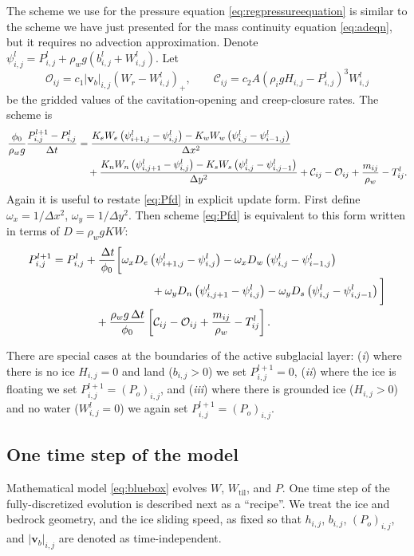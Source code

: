 \documentclass[11pt,final]{amsart}
\newcommand\bv{\mathbf{v}}
\newcommand{\Wtil}{W_{\text{til}}}
\newcommand{\Wlij}{W^l_{i,j}}
\newcommand{\Plij}{P^l_{i,j}}
\begin{document}
The scheme we use for the pressure equation \eqref{eq:regpressureequation} is similar to the scheme we have just presented for the mass continuity equation \eqref{eq:adeqn}, but it requires no advection approximation.  Denote $\psi_{i,j}^l = P_{i,j}^l + \rho_w g (b_{i,j}^l + W_{i,j}^l)$.  Let
	$$\mathcal{O}_{ij} = c_1 |\bv_b|_{i,j} \left(W_r - \Wlij\right)_+, \qquad \mathcal{C}_{ij} = c_2 A \left(\rho_i g H_{i,j} - \Plij\right)^3 \Wlij$$
be the gridded values of the cavitation-opening and creep-closure rates.  The scheme is
\begin{align}
\frac{\phi_0}{\rho_w g} \frac{P_{i,j}^{l+1} - \Plij}{\Delta t} &= \frac{K_e W_e \left(\psi_{i+1,j}^l - \psi_{i,j}^l\right) - K_w W_w \left(\psi_{i,j}^l - \psi_{i-1,j}^l\right)}{\Delta x^2}  \label{eq:Pfd} \\
      &\quad + \frac{K_n W_n \left(\psi_{i,j+1}^l - \psi_{i,j}^l\right) - K_s W_s \left(\psi_{i,j}^l - \psi_{i,j-1}^l\right)}{\Delta y^2} + \mathcal{C}_{ij} - \mathcal{O}_{ij} + \frac{m_{ij}}{\rho_w} - T_{ij}^l. \notag
\end{align}
Again it is useful to restate \eqref{eq:Pfd} in explicit update form.  First define $\omega_x = 1/\Delta x^2$, $\omega_y = 1/\Delta y^2$.   Then scheme \eqref{eq:Pfd} is equivalent to this form written in terms of $D=\rho_w g K W$:
\begin{align}
P_{i,j}^{l+1} = \Plij &+  \frac{\,\Delta t}{\phi_0} \bigg[\omega_x D_e \left(\psi_{i+1,j}^l - \psi_{i,j}^l\right) - \omega_x D_w \left(\psi_{i,j}^l - \psi_{i-1,j}^l\right) \label{eq:Pfdupdate} \\
      &\qquad\qquad\qquad + \omega_y D_n \left(\psi_{i,j+1}^l - \psi_{i,j}^l\right) - \omega_y D_s \left(\psi_{i,j}^l - \psi_{i,j-1}^l\right)\bigg] \notag \\
      &\quad + \frac{\rho_w g\,\Delta t}{\phi_0} \left[\mathcal{C}_{ij} - \mathcal{O}_{ij} + \frac{m_{ij}}{\rho_w} - T_{ij}^l\right]. \notag
\end{align}

There are special cases at the boundaries of the active subglacial layer: (\emph{i}) where there is no ice $H_{i,j}=0$ and land ($b_{i,j}>0$) we set $P_{i,j}^{l+1}=0$, (\emph{ii}) where the ice is floating we set $P_{i,j}^{l+1}=(P_o)_{i,j}$, and (\emph{iii}) where there is grounded ice ($H_{i,j}>0$) and no water ($W_{i,j}^l=0$) we again set $P_{i,j}^{l+1}=(P_o)_{i,j}$. 

\subsection*{One time step of the model}  Mathematical model \eqref{eq:bluebox} evolves $W$, $\Wtil$, and $P$.  One time step of the fully-discretized evolution is described next as a ``recipe''.  We treat the ice and bedrock geometry, and the ice sliding speed, as fixed so that $h_{i,j}$, $b_{i,j}$, $(P_o)_{i,j}$, and $|\bv_b|_{i,j}$ are denoted as time-independent.
\end{document}
